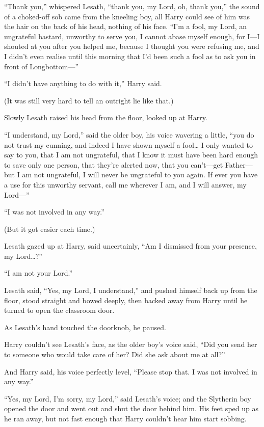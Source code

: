 ``Thank you,'' whispered Lesath, ``thank you, my Lord, oh, thank you,''
the sound of a choked-off sob came from the kneeling boy, all Harry
could see of him was the hair on the back of his head, nothing of his
face. ``I'm a fool, my Lord, an ungrateful bastard, unworthy to serve
you, I cannot abase myself enough, for I---I shouted at you after you
helped me, because I thought you were refusing me, and I didn't even
realise until this morning that I'd been such a fool as to ask you in
front of Longbottom---''

``I didn't have anything to do with it,'' Harry said.

(It was still very hard to tell an outright lie like that.)

Slowly Lesath raised his head from the floor, looked up at Harry.

``I understand, my Lord,'' said the older boy, his voice wavering a
little, ``you do not trust my cunning, and indeed I have shown myself a
fool\ldots{} I only wanted to say to you, that I am not ungrateful, that
I know it must have been hard enough to save only one person, that
they're alerted now, that you can't---get Father---but I am not
ungrateful, I will never be ungrateful to you again. If ever you have a
use for this unworthy servant, call me wherever I am, and I will answer,
my Lord---''

``I was not involved in any way.''

(But it got easier each time.)

Lesath gazed up at Harry, said uncertainly, ``Am I dismissed from your
presence, my Lord\ldots{}?''

``I am not your Lord.''

Lesath said, ``Yes, my Lord, I understand,'' and pushed himself back up
from the floor, stood straight and bowed deeply, then backed away from
Harry until he turned to open the classroom door.

As Lesath's hand touched the doorknob, he paused.

Harry couldn't see Lesath's face, as the older boy's voice said, ``Did
you send her to someone who would take care of her? Did she ask about me
at all?''

And Harry said, his voice perfectly level, ``Please stop that. I was not
involved in any way.''

``Yes, my Lord, I'm sorry, my Lord,'' said Lesath's voice; and the
Slytherin boy opened the door and went out and shut the door behind him.
His feet sped up as he ran away, but not fast enough that Harry couldn't
hear him start sobbing.

